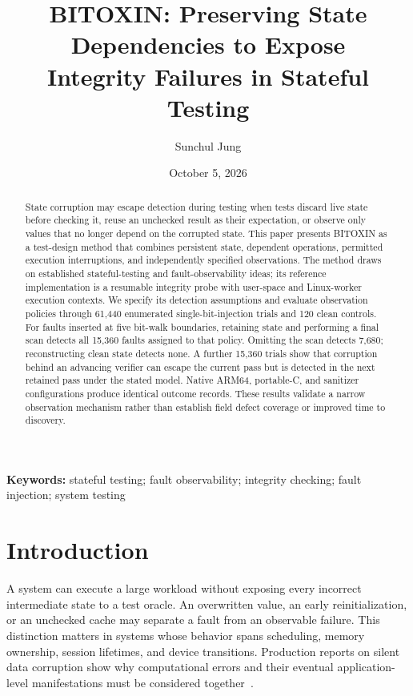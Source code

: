\documentclass[10pt,twocolumn,letterpaper]{article}
\title{BITOXIN: Preserving State Dependencies to Expose\\Integrity Failures in Stateful Testing}
\author{Sunchul Jung}
\date{October 5, 2026}
\begin{document}
\maketitle

\begin{abstract}
State corruption may escape detection during testing when tests discard live state before checking it, reuse an unchecked result as their expectation, or observe only values that no longer depend on the corrupted state. This paper presents BITOXIN as a test-design method that combines persistent state, dependent operations, permitted execution interruptions, and independently specified observations. The method draws on established stateful-testing and fault-observability ideas; its reference implementation is a resumable integrity probe with user-space and Linux-worker execution contexts. We specify its detection assumptions and evaluate observation policies through 61,440 enumerated single-bit-injection trials and 120 clean controls. For faults inserted at five bit-walk boundaries, retaining state and performing a final scan detects all 15,360 faults assigned to that policy. Omitting the scan detects 7,680; reconstructing clean state detects none. A further 15,360 trials show that corruption behind an advancing verifier can escape the current pass but is detected in the next retained pass under the stated model. Native ARM64, portable-C, and sanitizer configurations produce identical outcome records. These results validate a narrow observation mechanism rather than establish field defect coverage or improved time to discovery.
\end{abstract}
\par\smallskip
\noindent\textbf{Keywords:} stateful testing; fault observability; integrity checking; fault injection; system testing

\section{Introduction}
A system can execute a large workload without exposing every incorrect intermediate state to a test oracle. An overwritten value, an early reinitialization, or an unchecked cache may separate a fault from an observable failure. This distinction matters in systems whose behavior spans scheduling, memory ownership, session lifetimes, and device transitions. Production reports on silent data corruption show why computational errors and their eventual application-level manifestations must be considered together~\cite{dixit2022}.
\end{document}
